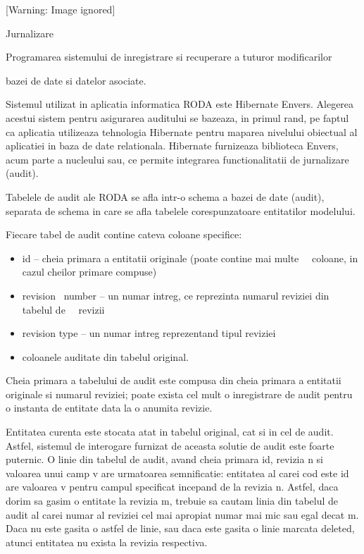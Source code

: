 \documentclass{article}
\begin{document}
\bigskip

  [Warning: Image ignored] %
 

Jurnalizare


\bigskip

Programarea sistemului de inregistrare si recuperare a tuturor modificarilor

bazei de date si datelor asociate.


\bigskip

Sistemul utilizat in aplicatia informatica RODA este Hibernate Envers. Alegerea acestui sistem pentru asigurarea auditului se bazeaza, in primul rand, pe faptul ca aplicatia utilizeaza tehnologia Hibernate pentru maparea nivelului obiectual al aplicatiei in baza de date relationala. Hibernate furnizeaza biblioteca Envers, acum parte a nucleului sau, ce permite integrarea functionalitatii de jurnalizare (audit).


\bigskip

Tabelele de audit ale RODA se afla intr-o schema a bazei de date (audit), separata de schema in care se afla tabelele corespunzatoare entitatilor modelului.


\bigskip

Fiecare tabel de audit contine cateva coloane specifice:

\begin{itemize}
\item id -- cheia primara a entitatii originale (poate contine mai multe \ \ coloane, in cazul cheilor primare compuse)
\item revision \ number -- un numar intreg, ce reprezinta numarul reviziei din tabelul de \ \ revizii
\item revision type -- un numar intreg reprezentand tipul reviziei
\item coloanele auditate din tabelul original.
\end{itemize}

\bigskip

Cheia primara a tabelului de audit este compusa din cheia primara a entitatii originale si numarul reviziei; poate exista cel mult o inregistrare de audit pentru o instanta de entitate data la o anumita revizie.

Entitatea curenta este stocata atat in tabelul original, cat si in cel de audit. Astfel, sistemul de interogare furnizat de aceasta solutie de audit este foarte puternic. O linie din tabelul de audit, avand cheia primara id, revizia n si valoarea unui camp v are urmatoarea semnificatie: entitatea al carei cod este id are valoarea v pentru campul specificat incepand de la revizia n. Astfel, daca dorim sa gasim o entitate la revizia m, trebuie sa cautam linia din tabelul de audit al carei numar al reviziei cel mai apropiat numar mai mic sau egal decat m. Daca nu este gasita o astfel de linie, sau daca este gasita o linie marcata deleted, atunci entitatea nu exista la revizia respectiva.
\end{document}
